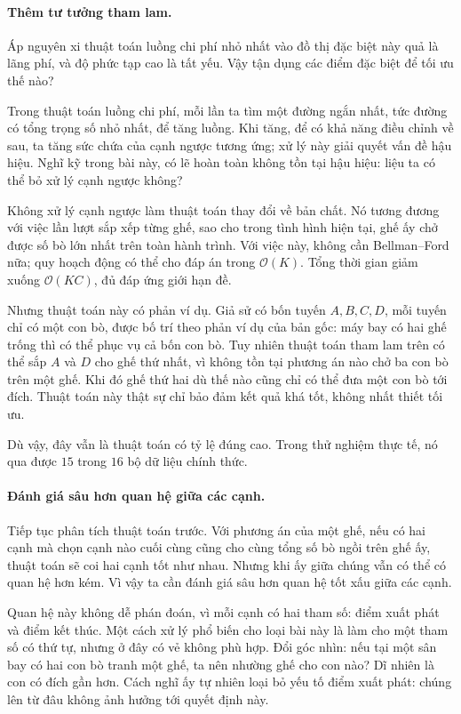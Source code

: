 \documentclass[11pt]{article}
\newcommand{\Oh}{\mathcal{O}}
\begin{document}
\paragraph{Thêm tư tưởng tham lam.}
Áp nguyên xi thuật toán luồng chi phí nhỏ nhất vào đồ thị đặc biệt này quả là
lãng phí, và độ phức tạp cao là tất yếu. Vậy tận dụng các điểm đặc biệt để tối
ưu thế nào?

Trong thuật toán luồng chi phí, mỗi lần ta tìm một đường ngắn nhất, tức đường
có tổng trọng số nhỏ nhất, để tăng luồng. Khi tăng, để có khả năng điều chỉnh
về sau, ta tăng sức chứa của cạnh ngược tương ứng; xử lý này giải quyết vấn
đề hậu hiệu. Nghĩ kỹ trong bài này, có lẽ hoàn toàn không tồn tại hậu hiệu:
liệu ta có thể bỏ xử lý cạnh ngược không?

Không xử lý cạnh ngược làm thuật toán thay đổi về bản chất. Nó tương đương
với việc lần lượt sắp xếp từng ghế, sao cho trong tình hình hiện tại, ghế ấy
chở được số bò lớn nhất trên toàn hành trình. Với việc này, không cần
Bellman--Ford nữa; quy hoạch động có thể cho đáp án trong \(\Oh(K)\). Tổng
thời gian giảm xuống \(\Oh(KC)\), đủ đáp ứng giới hạn đề.

Nhưng thuật toán này có phản ví dụ. Giả sử có bốn tuyến \(A,B,C,D\), mỗi tuyến
chỉ có một con bò, được bố trí theo phản ví dụ của bản gốc: máy bay
có hai ghế trống thì có thể phục vụ cả bốn con bò. Tuy nhiên thuật toán tham
lam trên có thể sắp \(A\) và \(D\) cho ghế thứ nhất, vì không tồn tại phương án
nào chở ba con bò trên một ghế. Khi đó ghế thứ hai dù thế nào cũng chỉ có thể
đưa một con bò tới đích. Thuật toán này thật sự chỉ bảo đảm kết quả khá tốt,
không nhất thiết tối ưu.

Dù vậy, đây vẫn là thuật toán có tỷ lệ đúng cao. Trong thử nghiệm thực tế, nó
qua được \(15\) trong \(16\) bộ dữ liệu chính thức.

\paragraph{Đánh giá sâu hơn quan hệ giữa các cạnh.}
Tiếp tục phân tích thuật toán trước. Với phương án của một ghế, nếu có hai
cạnh mà chọn cạnh nào cuối cùng cũng cho cùng tổng số bò ngồi trên ghế ấy,
thuật toán sẽ coi hai cạnh tốt như nhau. Nhưng khi ấy giữa chúng vẫn có thể
có quan hệ hơn kém. Vì vậy ta cần đánh giá sâu hơn quan hệ tốt xấu giữa các
cạnh.

Quan hệ này không dễ phán đoán, vì mỗi cạnh có hai tham số: điểm xuất phát và
điểm kết thúc. Một cách xử lý phổ biến cho loại bài này là làm cho một tham số
có thứ tự, nhưng ở đây có vẻ không phù hợp. Đổi góc nhìn: nếu tại một sân bay
có hai con bò tranh một ghế, ta nên nhường ghế cho con nào? Dĩ nhiên là con
có đích gần hơn. Cách nghĩ ấy tự nhiên loại bỏ yếu tố điểm xuất phát: chúng
lên từ đâu không ảnh hưởng tới quyết định này.
\end{document}
